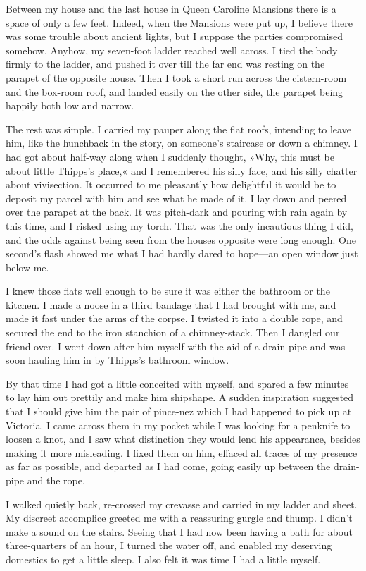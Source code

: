 Between my house and the last house in Queen Caroline Mansions there is a space of only a few feet. Indeed, when the Mansions were put up, I believe there was some trouble about ancient lights, but I suppose the parties compromised somehow. Anyhow, my seven-foot ladder reached well across. I tied the body firmly to the ladder, and pushed it over till the far end was resting on the parapet of the opposite house. Then I took a short run across the cistern-room and the box-room roof, and landed easily on the other side, the parapet being happily both low and narrow.

The rest was simple. I carried my pauper along the flat roofs, intending to leave him, like the hunchback in the story, on someone's staircase or down a chimney. I had got about half-way along when I suddenly thought, »Why, this must be about little Thipps's place,« and I remembered his silly face, and his silly chatter about vivisection. It occurred to me pleasantly how delightful it would be to deposit my parcel with him and see what he made of it. I lay down and peered over the parapet at the back. It was pitch-dark and pouring with rain again by this time, and I risked using my torch. That was the only incautious thing I did, and the odds against being seen from the houses opposite were long enough. One second's flash showed me what I had hardly dared to hope—an open window just below me.

I knew those flats well enough to be sure it was either the bathroom or the kitchen. I made a noose in a third bandage that I had brought with me, and made it fast under the arms of the corpse. I twisted it into a double rope, and secured the end to the iron stanchion of a chimney-stack. Then I dangled our friend over. I went down after him myself with the aid of a drain-pipe and was soon hauling him in by Thipps's bathroom window.

By that time I had got a little conceited with myself, and spared a few minutes to lay him out prettily and make him shipshape. A sudden inspiration suggested that I should give him the pair of pince-nez which I had happened to pick up at Victoria. I came across them in my pocket while I was looking for a penknife to loosen a knot, and I saw what distinction they would lend his appearance, besides making it more misleading. I fixed them on him, effaced all traces of my presence as far as possible, and departed as I had come, going easily up between the drain-pipe and the rope.

I walked quietly back, re-crossed my crevasse and carried in my ladder and sheet. My discreet accomplice greeted me with a reassuring gurgle and thump. I didn't make a sound on the stairs. Seeing that I had now been having a bath for about three-quarters of an hour, I turned the water off, and enabled my deserving domestics to get a little sleep. I also felt it was time I had a little myself.

